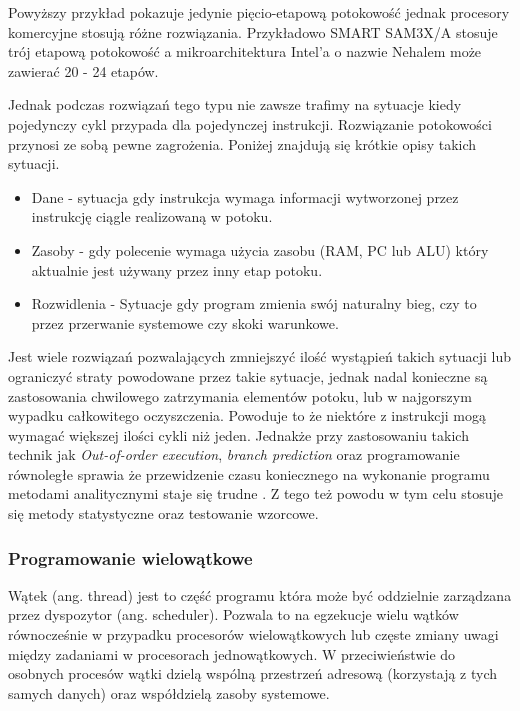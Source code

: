 Powyższy przykład pokazuje jedynie pięcio-etapową potokowość jednak procesory komercyjne stosują różne rozwiązania. Przykładowo SMART SAM3X/A stosuje trój etapową potokowość\cite{datasheet} a mikroarchitektura Intel'a o nazwie Nehalem może zawierać 20 - 24 etapów\cite{pipelining intel}.

Jednak podczas rozwiązań tego typu nie zawsze trafimy na sytuacje kiedy pojedynczy cykl przypada dla pojedynczej instrukcji. 
Rozwiązanie potokowości przynosi ze sobą pewne zagrożenia. Poniżej znajdują się krótkie opisy takich sytuacji. 

\begin{itemize}
        \item Dane - sytuacja gdy instrukcja wymaga informacji wytworzonej przez instrukcję ciągle realizowaną w potoku. 
        \item Zasoby - gdy polecenie wymaga użycia zasobu (RAM, PC lub ALU) który aktualnie jest używany przez inny etap potoku. 
        \item Rozwidlenia - Sytuacje gdy program zmienia swój naturalny bieg, czy to przez przerwanie systemowe czy skoki warunkowe. 
\end{itemize}

Jest wiele rozwiązań pozwalających zmniejszyć ilość wystąpień takich sytuacji lub ograniczyć straty powodowane przez takie sytuacje, jednak nadal konieczne są zastosowania chwilowego zatrzymania elementów potoku, lub w najgorszym wypadku całkowitego oczyszczenia.
Powoduje to że niektóre z instrukcji mogą wymagać większej ilości cykli niż jeden. Jednakże przy zastosowaniu takich technik jak
\textit{Out-of-order execution}, \textit{branch prediction} oraz programowanie równoległe  sprawia że przewidzenie czasu koniecznego na wykonanie programu metodami analitycznymi staje się trudne . 
Z tego też powodu w tym celu stosuje się metody statystyczne oraz testowanie wzorcowe. 

\subsubsection{Programowanie wielowątkowe}

Wątek (ang. thread) jest to część programu która może być oddzielnie zarządzana przez dyspozytor (ang. scheduler). 
Pozwala to na egzekucje wielu wątków równocześnie w przypadku procesorów wielowątkowych lub częste zmiany uwagi między zadaniami w procesorach jednowątkowych.
W przeciwieństwie do osobnych procesów wątki dzielą wspólną przestrzeń adresową (korzystają z tych samych danych) oraz współdzielą zasoby systemowe.

